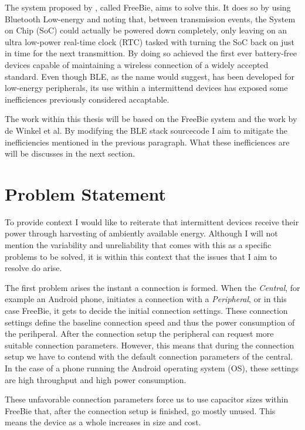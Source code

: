 The system proposed by \cite{freebie}, called FreeBie, aims to solve this. It does so by using Bluetooth Low-energy and noting that, between transmission events, the System on Chip (SoC) could actually be powered down completely, only leaving on an ultra low-power real-time clock (RTC) tasked with turning the SoC back on just in time for the next transmittion. By doing so \cite{freebie} achieved the first ever battery-free devices capable of maintaining a wireless connection of a widely accepted standard. Even though BLE, as the name would suggest, has been developed for low-energy peripherals, its use within a intermittend devices has exposed some inefficiences previously considered accaptable.

The work within this thesis will be based on the FreeBie system and the work by de Winkel et al. By modifying the BLE stack sourcecode I aim to mitigate the inefficiencies mentioned in the previous paragraph. What these inefficiences are will be discusses in the next section.

\section*{Problem Statement}
\label{sec:introduction_problem_statement}

To provide context I would like to reiterate that intermittent devices receive their power through harvesting of ambiently available energy. Although I will not mention the variability and unreliability that comes with this as a specific problems to be solved, it is within this context that the issues that I aim to resolve do arise.

The first problem arises the instant a connection is formed. When the \textit{Central}, for example an Android phone, initiates a connection with a \textit{Peripheral}, or in this case FreeBie, it gets to decide the initial connection settings. These connection settings define the baseline connection speed and thus the power consumption of the perihperal. After the connection setup the peripheral can request more suitable connection parameters. However, this means that during the connection setup we have to contend with the default connection parameters of the central. In the case of a phone running the Android operating system (OS), these settings are high throughput and high power consumption. 

These unfavorable connection parameters force us to use capacitor sizes within FreeBie that, after the connection setup is finished, go mostly unused. This means the device as a whole increases in size and cost. 

